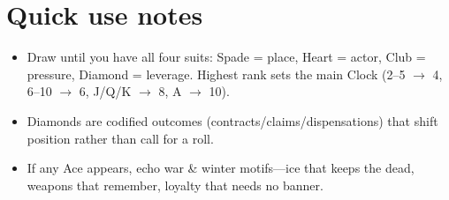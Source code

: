 \section*{Quick use notes}
\label{sec:black-banners-quick-use}
\begin{itemize}
\item Draw until you have all four suits: Spade = place, Heart = actor, Club = pressure, Diamond = leverage. Highest rank sets the main Clock (2--5 $\rightarrow$ 4, 6--10 $\rightarrow$ 6, J/Q/K $\rightarrow$ 8, A $\rightarrow$ 10).
\item Diamonds are codified outcomes (contracts/claims/dispensations) that shift position rather than call for a roll.
\item If any Ace appears, echo war \& winter motifs---ice that keeps the dead, weapons that remember, loyalty that needs no banner.
\end{itemize}

